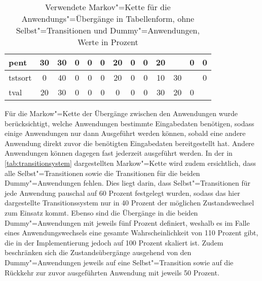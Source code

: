 \begin{table}
\begin{tabular}{|l|c|c|c|c|c|c|c|c|c|c|c|c|}
    	\acs{pent}    &     30      &    30     &     0      &      0      &    0     &    20    &     0      &      0      &    20    &            &       0       &     0      \\ \hline
    	\acs{tstsort} &      0      &    40     &     0      &      0      &    0     &    20    &     0      &      0      &    10    &     30     &               &     0      \\ \hline
    	\acs{tval}    &     20      &    30     &     0      &      0      &    0     &    0     &     0      &      0      &    30    &     20     &       0       &            \\ \hline
    \end{tabular}
    \caption[Verwendete Markov"=Kette für die Anwendungs"=Übergänge in Tabellenform]{Verwendete Markov"=Kette für die Anwendungs"=Übergänge in Tabellenform, ohne Selbst"=Transitionen und Dummy"=Anwendungen, Werte in Prozent}
    \label{tab:transitionsystem}
\end{table}

Für die Markow"=Kette der Übergänge zwischen den Anwendungen wurde berücksichtigt, welche Anwendungen bestimmte Eingabedaten benötigen, sodass einige Anwendungen nur dann Ausgeführt werden können, sobald eine andere Anwendung direkt zuvor die benötigten Eingabedaten bereitgestellt hat. Andere Anwendungen können dagegen fast jederzeit ausgeführt werden. In der in \autoref{tab:transitionsystem} dargestellten Markow"=Kette wird zudem ersichtlich, dass alle Selbst"=Transitionen sowie die Transitionen für die beiden Dummy"=Anwendungen fehlen. Dies liegt darin, dass Selbst"=Transitionen für jede Anwendung pauschal auf 60 Prozent festgelegt wurden, sodass das hier dargestellte Transitionssystem nur in 40 Prozent der möglichen Zustandswechsel zum Einsatz kommt. Ebenso sind die Übergänge in die beiden Dummy"=Anwendungen mit jeweils fünf Prozent definiert, weshalb es im Falle eines Anwendungswechsels eine gesamte Wahrscheinlichkeit von 110 Prozent gibt, die in der Implementierung jedoch auf 100 Prozent skaliert ist. Zudem beschränken sich die Zustandsübergänge ausgehend von den Dummy"=Anwendungen jeweils auf eine Selbst"=Transition sowie auf die Rückkehr zur zuvor ausgeführten Anwendung mit jeweils 50 Prozent.